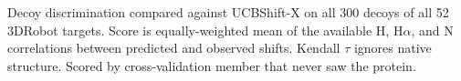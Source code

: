 Decoy discrimination compared against UCBShift-X on all 300 decoys of all 52 3DRobot targets. Score is equally-weighted mean of the available H, H$\alpha$, and N correlations between predicted and observed shifts. Kendall $\tau$ ignores native structure. Scored by cross-validation member that never saw the protein.
